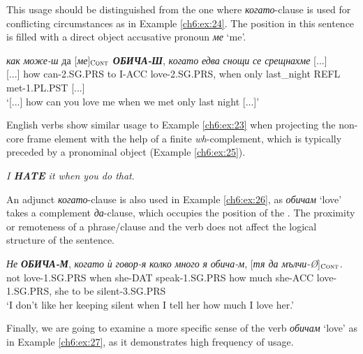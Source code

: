 \documentclass[output=paper,colorlinks,citecolor=brown]{langscibook}
\begin{document}
This usage should be distinguished from the one where \textit{когато}-clause is used for conflicting circumstances as in Example \ref{ch6:ex:24}. The  position in this sentence is filled with a direct object accusative pronoun \textit{ме} `me'.

\begin{exe} 
\ex  \label{ch6:ex:24} 
\gll [...] \textit{как} {\textit{може-ш}} {да} [{\textit{ме}}]$_{\text{\textsc{Cont}}}$ \textit{\textbf{ОБИЧА-Ш}}, \textit{когато} \textit{едва} \textit{снощи} \textit{се срещнахме}  [...] \\ 
{}[...] {how} {can-2.SG.PRS} {to} {I-ACC} {love-2.SG.PRS}, {when} only last\_night {REFL met-1.PL.PST} [...]
\\ %
\glt `[...] how can you love me when we met only last night [...]'
\end{exe} 

English verbs show similar usage to Example \ref{ch6:ex:23} when projecting the non-core frame element  with the help of a finite  \textit{wh}-complement, which is typically preceded by a pronominal object (Example \ref{ch6:ex:25}).


\begin{exe}  
\ex  \label{ch6:ex:25}
\textit{I \textbf{HATE} it when you do that}.
\end{exe}

An adjunct \textit{когато}-clause is also used in Example \ref{ch6:ex:26}, as \textit{обичам} `love' takes a complement \textit{да}-clause,  which occupies the position of the . The proximity or remoteness of a phrase/clause and the verb does not affect the logical structure of the sentence.

\begin{exe} 
\ex   \label{ch6:ex:26}
\gll \textit{Не} {\textit{\textbf{ОБИЧА-М}}}, {\textit{когато}} {\textit{ѝ}}  {\textit{говор-я}} {\textit{колко}} {\textit{много}} {\textit{я}} {\textit{обича-м}}, [\textit{тя да мълчи-Ø}]$_{\text{\textsc{Cont}}}$. \\ 
{not} {love-1.SG.PRS} {when} {she-DAT} {speak-1.SG.PRS} {how} {much} {she-ACC} {love-1.SG.PRS}, {she to be silent-3.SG.PRS}
\\%
\glt `I don't like her keeping silent when I tell her how much I love her.'
\end{exe} 

Finally, we are going to examine a more specific sense of the verb \textit{обичам} `love' as in Example \ref{ch6:ex:27}, as it demonstrates high frequency of usage. 
\end{document}
